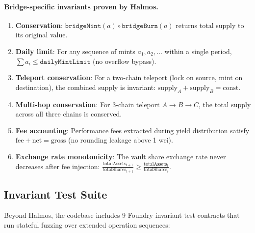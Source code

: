 \documentclass[11pt]{article}
\begin{document}
\paragraph{Bridge-specific invariants proven by Halmos.}

\begin{enumerate}[leftmargin=1.1em]
  \item \textbf{Conservation}: $\texttt{bridgeMint}(a) \circ \texttt{bridgeBurn}(a)$ returns total supply to its original value.
  \item \textbf{Daily limit}: For any sequence of mints $a_1, a_2, \ldots$ within a single period, $\sum a_i \leq \texttt{dailyMintLimit}$ (no overflow bypass).
  \item \textbf{Teleport conservation}: For a two-chain teleport (lock on source, mint on destination), the combined supply is invariant: $\text{supply}_A + \text{supply}_B = \text{const}$.
  \item \textbf{Multi-hop conservation}: For 3-chain teleport $A \to B \to C$, the total supply across all three chains is conserved.
  \item \textbf{Fee accounting}: Performance fees extracted during yield distribution satisfy $\text{fee} + \text{net} = \text{gross}$ (no rounding leakage above 1 wei).
  \item \textbf{Exchange rate monotonicity}: The vault share exchange rate never decreases after fee injection: $\frac{\text{totalAssets}_{t+1}}{\text{totalShares}_{t+1}} \geq \frac{\text{totalAssets}_t}{\text{totalShares}_t}$.
\end{enumerate}

\subsection{Invariant Test Suite}

Beyond Halmos, the codebase includes 9 Foundry invariant test contracts that run stateful fuzzing over extended operation sequences:
\end{document}
